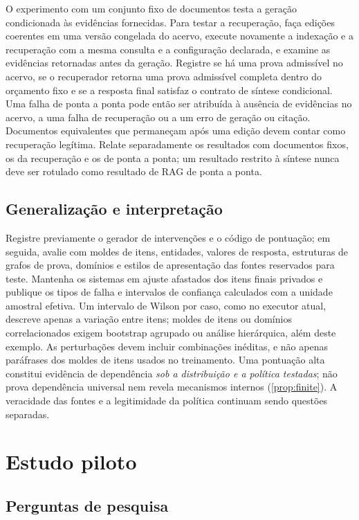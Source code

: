 \documentclass[10pt,twocolumn]{article}
\begin{document}
O experimento com um conjunto fixo de documentos testa a geração condicionada
às evidências fornecidas. Para testar a recuperação, faça edições coerentes
em uma versão congelada do acervo, execute novamente a indexação e a
recuperação com a mesma consulta e a configuração declarada, e examine as
evidências retornadas antes da geração. Registre se há uma prova admissível
no acervo, se o recuperador retorna uma prova admissível completa dentro do
orçamento fixo e se a resposta final satisfaz o contrato de síntese
condicional. Uma falha de ponta a ponta pode então ser atribuída à ausência
de evidências no acervo, a uma falha de recuperação ou a um erro de geração
ou citação. Documentos equivalentes que permaneçam após uma edição devem
contar como recuperação legítima. Relate separadamente os resultados com
documentos fixos, os da recuperação e os de ponta a ponta; um resultado
restrito à síntese nunca deve ser rotulado como resultado de RAG de ponta a
ponta.

\subsection{Generalização e interpretação}

Registre previamente o gerador de intervenções e o código de pontuação; em
seguida, avalie com moldes de itens, entidades, valores de resposta,
estruturas de grafos de prova, domínios e estilos de apresentação das fontes
reservados para teste. Mantenha os sistemas em ajuste afastados dos itens finais privados
e publique os tipos de falha e intervalos de confiança calculados com a
unidade amostral efetiva. Um intervalo de Wilson por caso, como no executor
atual, descreve apenas a variação entre itens; moldes de itens ou domínios
correlacionados exigem bootstrap agrupado ou análise hierárquica, além deste
exemplo. As perturbações devem incluir combinações inéditas, e não apenas
paráfrases dos moldes de itens usados no treinamento. Uma pontuação alta
constitui evidência de dependência \emph{sob a distribuição e a política
testadas}; não prova dependência universal nem revela mecanismos internos
(\cref{prop:finite}). A veracidade das fontes e a legitimidade da política
continuam sendo questões separadas.

\section{Estudo piloto}

\subsection{Perguntas de pesquisa}
\end{document}
